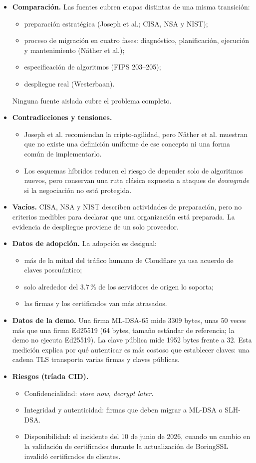 \begin{itemize}[leftmargin=*]
  \item \textbf{Comparación.} Las fuentes cubren etapas distintas de una misma transición:
  \begin{itemize}
    \item preparación estratégica (Joseph et al.; CISA, NSA y NIST);
    \item proceso de migración en cuatro fases: diagnóstico, planificación, ejecución y mantenimiento (Näther et al.);
    \item especificación de algoritmos (FIPS 203--205);
    \item despliegue real (Westerbaan).
  \end{itemize}
  Ninguna fuente aislada cubre el problema completo.
  \item \textbf{Contradicciones y tensiones.}
  \begin{itemize}
    \item Joseph et al. recomiendan la cripto-agilidad, pero Näther et al. muestran que no existe una definición uniforme de ese concepto ni una forma común de implementarlo.
    \item Los esquemas híbridos reducen el riesgo de depender solo de algoritmos nuevos, pero conservan una ruta clásica expuesta a ataques de \textit{downgrade} si la negociación no está protegida.
  \end{itemize}
  \item \textbf{Vacíos.} CISA, NSA y NIST describen actividades de preparación, pero no criterios medibles para declarar que una organización está preparada. La evidencia de despliegue proviene de un solo proveedor.
  \item \textbf{Datos de adopción.} La adopción es desigual:
  \begin{itemize}
    \item más de la mitad del tráfico humano de Cloudflare ya usa acuerdo de claves poscuántico;
    \item solo alrededor del 3.7\,\% de los servidores de origen lo soporta;
    \item las firmas y los certificados van más atrasados.
  \end{itemize}
  \item \textbf{Datos de la demo.} Una firma ML-DSA-65 mide 3309 bytes, unas 50 veces más que una firma Ed25519 (64 bytes, tamaño estándar de referencia; la demo no ejecuta Ed25519). La clave pública mide 1952 bytes frente a 32. Esta medición explica por qué autenticar es más costoso que establecer claves: una cadena TLS transporta varias firmas y claves públicas.
  \item \textbf{Riesgos (tríada CID).}
  \begin{itemize}
    \item Confidencialidad: \textit{store now, decrypt later}.
    \item Integridad y autenticidad: firmas que deben migrar a ML-DSA o SLH-DSA.
    \item Disponibilidad: el incidente del 10 de junio de 2026, cuando un cambio en la validación de certificados durante la actualización de BoringSSL invalidó certificados de clientes.
  \end{itemize}
\end{itemize}
